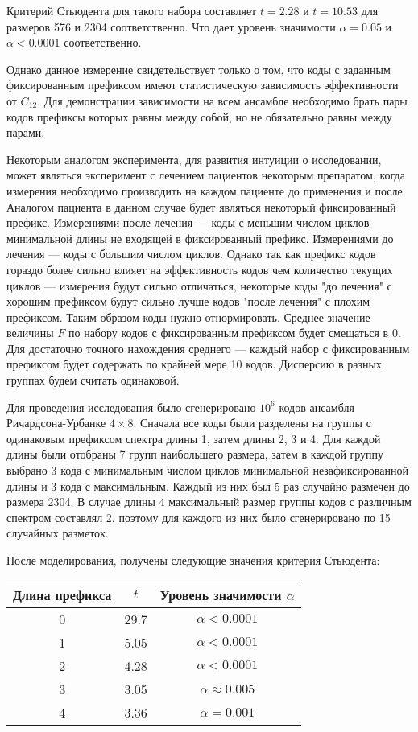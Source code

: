 Критерий Стьюдента для такого набора составляет $t=2.28$ и $t=10.53$ для размеров 576 и 2304 соответственно.
Что дает уровень значимости $\alpha=0.05$ и $\alpha<0.0001$ соответственно.

Однако данное измерение свидетельствует только о том, что коды с заданным фиксированным префиксом
 имеют статистическую зависимость эффективности от $C_{12}$. Для демонстрации зависимости на всем
 ансамбле необходимо брать пары кодов префиксы которых равны между собой, но не обязательно равны
 между парами. 
 
 Некоторым аналогом эксперимента, для развития интуиции о исследовании, может являться эксперимент
 с лечением пациентов некоторым препаратом, когда измерения необходимо производить на каждом пациенте
 до применения и после. Аналогом пациента в данном случае будет являться некоторый фиксированный префикс.
 Измерениями после лечения --- коды с меньшим числом циклов минимальной длины не входящей в фиксированный
 префикс. Измерениями до лечения --- коды с большим числом циклов. Однако так как префикс кодов
 гораздо более сильно влияет на эффективность кодов чем количество текущих циклов --- измерения будут
 сильно отличаться, некоторые коды "до лечения" с хорошим префиксом будут сильно лучше кодов
 "после лечения" с плохим префиксом. Таким образом коды нужно отнормировать. Среднее значение
 величины $F$ по набору кодов с фиксированным префиксом будет смещаться в 0. Для достаточно точного
 нахождения среднего --- каждый набор с фиксированным префиксом будет содержать по крайней мере 10
 кодов. Дисперсию в разных группах будем считать одинаковой.
 
 Для проведения исследования было сгенерировано $10^6$ кодов ансамбля Ричардсона-Урбанке $4 \times 8$.
 Сначала все коды были разделены на группы с одинаковым префиксом спектра длины 1, затем длины 2, 3 и 4.
 Для каждой длины были отобраны 7 групп наибольшего размера, затем в каждой группу выбрано 3 кода с минимальным
 числом циклов минимальной незафиксированной длины и 3 кода с максимальным. Каждый из них
 был 5 раз случайно размечен до размера 2304. В случае длины 4 максимальный размер группы кодов 
 с различным спектром составлял 2, поэтому для каждого из них было сгенерировано по 15 случайных разметок. 

После моделирования, получены следующие значения критерия Стьюдента:

\begin{tabular}{|c|c|c|}
	\hline
	Длина префикса & $t$ & Уровень значимости $\alpha$\\
	\hline
	0 & 29.7 &  $\alpha < 0.0001$\\
	\hline
	1 & 5.05 &  $\alpha < 0.0001$\\
	\hline
	2 & 4.28 & $\alpha < 0.0001$ \\
	\hline
	3 & 3.05 & $\alpha \approx 0.005$ \\
	\hline
	4 & 3.36 & $\alpha = 0.001$ \\
	\hline
\end{tabular}


